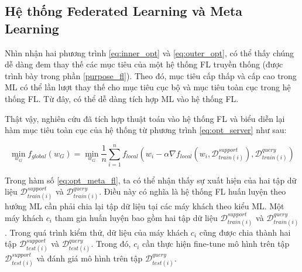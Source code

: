 \subsection{Hệ thống Federated Learning và Meta Learning}


Nhìn nhận hai phương trình \ref{eq:inner_opt} và \ref{eq:outer_opt}, có thể thấy chúng dễ dàng đem thay thế các mục tiêu của một hệ thống FL truyền thống (được trình bày trong phần \ref{purpose_fl}). Theo đó, mục tiêu cấp thấp và cấp cao trong ML có thể lần lượt thay thế cho mục tiêu cục bộ và mục tiêu toàn cục trong hệ thống FL. Từ đây, có thể dễ dàng tích hợp ML vào hệ thống FL.

Thật vậy, nghiên cứu \cite{fallah2020personalized} đã tích hợp thuật toán  vào hệ thống FL và biểu diễn lại hàm mục tiêu toàn cục của hệ thống từ phương trình \ref{eq:opt_server} như sau:

\begin{equation}
    \label{eq:opt_meta_fl}
    \min_{w_G} f_{global}(w_G)
        =\min_{w_G} \frac{1}{n} \sum_{i=1}^n f_{local}\left(w_i - \alpha \nabla f_{local}(w_i, \mathcal{D}_{train(i)}^{support}), \mathcal{D}_{train(i)}^{query}\right)
\end{equation}

Trong hàm số \ref{eq:opt_meta_fl}, ta có thể nhận thấy sự xuất hiện của hai tập dữ liệu $\mathcal{D}_{train(i)}^{support}$ và $\mathcal{D}_{train(i)}^{query}$. Điều này có nghĩa là hệ thống FL huấn luyện theo hướng ML cần phải chia lại tập dữ liệu tại các máy khách theo kiểu ML. Một máy khách $c_i$ tham gia huấn luyện bao gồm hai tập dữ liệu $\mathcal{D}_{train(i)}^{support}$ và $\mathcal{D}_{train(i)}^{query}$. Trong quá trình kiểm thử, dữ liệu của máy khách $c_i$ cũng được chia thành hai tập $\mathcal{D}_{test(i)}^{support}$ và $\mathcal{D}_{test(i)}^{query}$. Trong đó, $c_i$ cần thực hiện fine-tune mô hình trên tập $\mathcal{D}_{test(i)}^{support}$ và đánh giá mô hình trên tập $\mathcal{D}_{test(i)}^{query}$.

